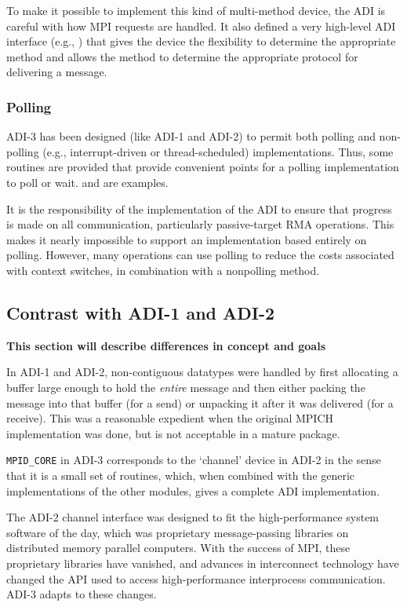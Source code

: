 \documentclass{article}
\begin{document}
To make it possible to implement this kind of multi-method device, the
ADI is careful with how MPI requests are handled.  It also defined a
very high-level ADI interface (e.g., ) that gives the
device the flexibility to determine the appropriate method and allows
the method to determine the appropriate protocol for delivering a message.

\subsubsection{Polling}
ADI-3 has been designed (like ADI-1 and ADI-2) to permit both polling and
non-polling (e.g., interrupt-driven or thread-scheduled) implementations.
Thus, some routines are provided that provide convenient points for a polling
implementation to poll or wait.   and
 are examples.

It is the responsibility of the implementation of the ADI to ensure that
progress is made on all communication, particularly passive-target RMA
operations.  This makes it nearly impossible to support an implementation
based entirely on polling.  However, many operations can use polling to reduce
the costs associated with context switches, in combination with a nonpolling
method.

\subsection{Contrast with ADI-1 and ADI-2}
\label{sec-historical}
\textbf{This section will describe differences in concept and goals}

In ADI-1 and ADI-2, non-contiguous datatypes were handled by first
allocating a buffer large enough to hold the \emph{entire} message and
then either packing the message into that buffer (for a send) or
unpacking it after it was delivered (for a receive).  This was a
reasonable expedient when the original MPICH implementation was done,
but is not acceptable in a mature package.

\texttt{MPID_CORE} in ADI-3 corresponds to the `channel' device in ADI-2 in
the sense that it is a small set of routines, which, when combined with the
generic implementations of the other modules, gives a complete ADI
implementation.  

The ADI-2 channel interface was designed to fit the high-performance system
software of the day, which was proprietary message-passing libraries on
distributed memory parallel computers.  With the success of MPI, these
proprietary libraries have vanished, and advances in interconnect technology
have changed the API used to access high-performance interprocess
communication.  ADI-3 adapts to these changes.
\end{document}
